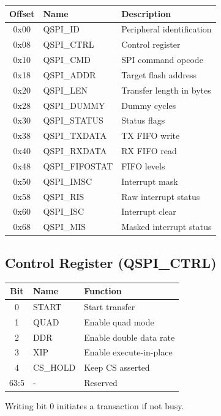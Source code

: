\begin{center}
\begin{tabular}{|c|l|l|}
\hline
Offset & Name        & Description \\
\hline
0x00 & QSPI\_ID      & Peripheral identification \\
0x08 & QSPI\_CTRL    & Control register \\
0x10 & QSPI\_CMD     & SPI command opcode \\
0x18 & QSPI\_ADDR    & Target flash address \\
0x20 & QSPI\_LEN     & Transfer length in bytes \\
0x28 & QSPI\_DUMMY   & Dummy cycles \\
0x30 & QSPI\_STATUS  & Status flags \\
0x38 & QSPI\_TXDATA  & TX FIFO write \\
0x40 & QSPI\_RXDATA  & RX FIFO read \\
0x48 & QSPI\_FIFOSTAT& FIFO levels \\
0x50 & QSPI\_IMSC    & Interrupt mask \\
0x58 & QSPI\_RIS     & Raw interrupt status \\
0x60 & QSPI\_ISC     & Interrupt clear \\
0x68 & QSPI\_MIS     & Masked interrupt status \\
\hline
\end{tabular}
\end{center}

\subsection{Control Register (QSPI\_CTRL)}

\begin{center}
\begin{tabular}{|c|l|l|}
\hline
Bit & Name & Function \\
\hline
0 & START & Start transfer \\
1 & QUAD  & Enable quad mode \\
2 & DDR   & Enable double data rate \\
3 & XIP   & Enable execute-in-place \\
4 & CS\_HOLD & Keep CS asserted \\
63:5 & - & Reserved \\
\hline
\end{tabular}
\end{center}

Writing bit 0 initiates a transaction if not busy.

